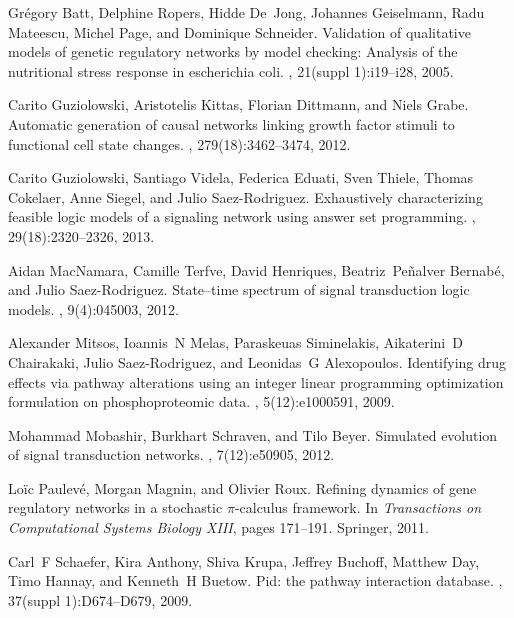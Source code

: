 \documentclass[11pt,a4paper,twoside]{epig}
\begin{document}
\begin{thebibliography}{10}

Gr{\'e}gory Batt, Delphine Ropers, Hidde De~Jong, Johannes Geiselmann, Radu
  Mateescu, Michel Page, and Dominique Schneider.
\newblock Validation of qualitative models of genetic regulatory networks by
  model checking: Analysis of the nutritional stress response in escherichia
  coli.
, 21(suppl 1):i19--i28, 2005.

Carito Guziolowski, Aristotelis Kittas, Florian Dittmann, and Niels Grabe.
\newblock Automatic generation of causal networks linking growth factor stimuli
  to functional cell state changes.
, 279(18):3462--3474, 2012.

Carito Guziolowski, Santiago Videla, Federica Eduati, Sven Thiele, Thomas
  Cokelaer, Anne Siegel, and Julio Saez-Rodriguez.
\newblock Exhaustively characterizing feasible logic models of a signaling
  network using answer set programming.
, 29(18):2320--2326, 2013.

Aidan MacNamara, Camille Terfve, David Henriques, Beatriz~Pe{\~n}alver
  Bernab{\'e}, and Julio Saez-Rodriguez.
\newblock State--time spectrum of signal transduction logic models.
, 9(4):045003, 2012.

Alexander Mitsos, Ioannis~N Melas, Paraskeuas Siminelakis, Aikaterini~D
  Chairakaki, Julio Saez-Rodriguez, and Leonidas~G Alexopoulos.
\newblock Identifying drug effects via pathway alterations using an integer
  linear programming optimization formulation on phosphoproteomic data.
, 5(12):e1000591, 2009.

Mohammad Mobashir, Burkhart Schraven, and Tilo Beyer.
\newblock Simulated evolution of signal transduction networks.
, 7(12):e50905, 2012.

{L}o{\"i}c {P}aulev{\'e}, {M}organ {M}agnin, and {O}livier {R}oux.
\newblock Refining dynamics of gene regulatory networks in a stochastic
  $\pi$-calculus framework.
\newblock In {\em Transactions on Computational Systems Biology XIII}, pages
  171--191. Springer, 2011.

Carl~F Schaefer, Kira Anthony, Shiva Krupa, Jeffrey Buchoff, Matthew Day, Timo
  Hannay, and Kenneth~H Buetow.
\newblock Pid: the pathway interaction database.
, 37(suppl 1):D674--D679, 2009.


\end{thebibliography}
\end{document}
